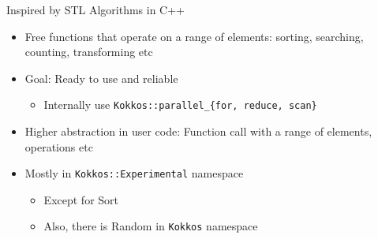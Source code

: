 \documentclass[
    aspectratio=169,
]{beamer}
\begin{document}
\begin{frame}[fragile]{Inspired by STL Algorithms in C++}
    \begin{itemize}
        \item Free functions that operate on a range of elements:
        sorting, searching, counting, transforming etc
        \item Goal: Ready to use and reliable
        \begin{itemize}
            \item Internally use \texttt{Kokkos::parallel\_\{for, reduce, scan\}}
        \end{itemize}
        \item Higher abstraction in user code: Function call with a range of elements, operations etc
        \item Mostly in \texttt{Kokkos::Experimental} namespace
        \begin{itemize}
            \item Except for Sort
            \item Also, there is Random in \texttt{Kokkos} namespace
        \end{itemize}
    \end{itemize}

\end{frame}
\end{document}
